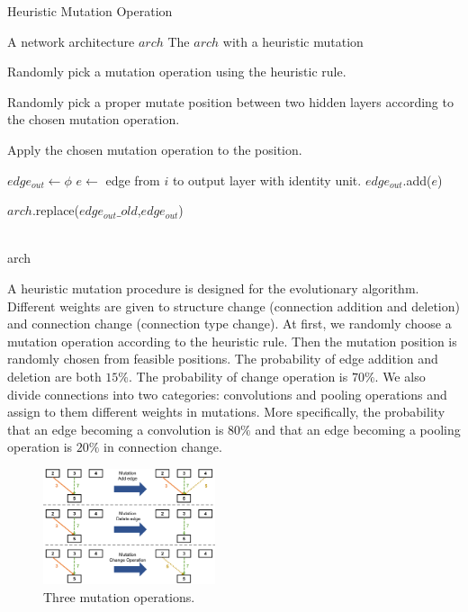 \documentclass[conference]{IEEEtran}
\begin{document}
 \begin{algorithm}[H]  
    \caption{Heuristic Mutation Operation}
    
    
    \begin{algorithmic}[1]  
        \Require A network architecture $arch$
        \Ensure The $arch$ with a heuristic mutation
        
        \State Randomly pick a mutation operation using the heuristic rule.
        
        \State Randomly pick a proper mutate position between two hidden layers according to the chosen mutation operation.
        
        \State Apply the chosen mutation operation to the position.
        
        \State $edge_{out} \gets \phi$
        \State $e \gets$ edge from $i$ to output layer with identity unit.
        \State $edge_{out}$.add($e$)
        \EndFor
        
        \State $arch$.replace($edge_{out}\_old$,$edge_{out}$)
        
        \\
        \Return arch
    \end{algorithmic}  
    \label{mutation}
\end{algorithm}  

  A heuristic mutation procedure is designed for the evolutionary algorithm. Different weights are given to structure change (connection addition and deletion) and connection change (connection type change). At first, we randomly choose a mutation operation according to the heuristic rule. Then the mutation position is randomly chosen from feasible positions. The probability of edge addition and deletion are both $15\%$. The probability of change operation is $70\%$. We also divide connections into two categories: convolutions and pooling operations and assign to them different weights in mutations. More specifically, the probability that an edge becoming a convolution is $80\%$ and that an edge becoming a pooling operation is $20\%$ in connection change. 

\begin{figure}[H]
  \centering
  \includegraphics[width=0.45\textwidth]{figures/mutation.png}
  \caption{Three mutation operations.}\label{fig:digit}
  \label{mutation}
\end{figure}
\end{document}
